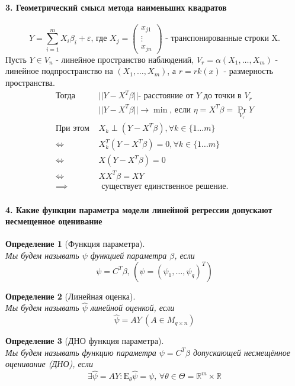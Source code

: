 \documentclass[titlepage]{article}
\newcommand{\sE}{\mathrm{E}}
\newcommand{\R}{\mathbb{R}} %
\DeclareMathOperator{\proj}{Pr} %
\newtheorem{definition}{Определение}
\begin{document}
\paragraph{3. Геометрический смысл метода наименьших квадратов}
\[	Y = \sum_{i=1}^m X_i\beta_i + \varepsilon\text{, где }X_j = \begin{pmatrix}
	x_{j1}\\
	\vdots\\
	x_{jn}
\end{pmatrix}\text{ - транспонированные строки X.}\]
Пусть $Y \in V_n$ - линейное пространство наблюдений, $V_r = \alpha(X_1,\dots,X_m)$  - линейное подпространство на $(X_1,\dots,X_m)$, а $r = rk(x)$ - размерность пространства.\\
\begin{align*}
	\text{Тогда } &||Y-X^T\beta|| \text{- расстояние от $Y$ до точки  в $V_r$}\\
	&||Y-X^T\beta||\rightarrow \min\text{, если } \eta = X^T\beta=\proj_{V_r}Y\\
	\text{При этом } & X_k \perp (Y-X^T\beta), \forall k \in \{1\ldots m\}\\
	\iff & X_k^T(Y-X^T\beta) = 0, \forall k \in \{1\ldots m\}\\
	\iff & X(Y-X^T\beta) = 0\\
	\iff & XX^T\beta = XY\\
	\implies &\text{ существует единственное решение.}
\end{align*}

\paragraph{4. Какие функции параметра модели линейной регрессии допускают несмещенное оценивание}
\begin{definition}[Функция параметра] ~\\
	Мы будем называть $\psi$ функцией параметра $\beta$, если
	\[\psi = C^T\beta,\,(\psi = (\psi_1,\dots,\psi_q)^T)\]
\end{definition}
\begin{definition}[Линейная оценка] ~\\
	Мы будем называть $\hat \psi$ линейной оценкой, если
	\[\hat\psi = AY\ (A \in M_{q \times n})\]
\end{definition}
\begin{definition}[ДНО функция параметра] ~\\
	Мы будем называть функцию параметра $\psi = C^T\beta$ допускающей несмещённое оценивание (ДНО), если
	\[\exists \hat \psi = AY: \sE_\theta \hat \psi = \psi,\,\forall \theta \in \Theta = \R^m \times \R\]
\end{definition}
\end{document}
